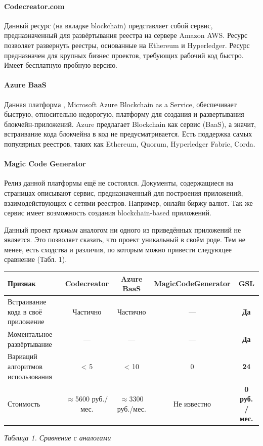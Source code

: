 \paragraph{Codecreator.com}
Данный ресурс \cite{CodeCreator} (на вкладке blockchain) представляет собой
сервис, предназначенный для развёртывания реестра на сервере Amazon AWS. Ресурс
позволяет развернуть реестры, основанные на Ethereum и Hyperledger. Ресурс
предназначен для крупных бизнес проектов, требующих рабочий код быстро. Имеет
бесплатную пробную версию.

\paragraph{Azure BaaS}
Данная платформа \cite{MicrosoftAzure}, Microsoft Azure Blockchain as a
Service, обеспечивает быструю, относительно недорогую, платформу для создания и
развертывания блокчейн-приложений. Azure предлагает Blockchain как сервис
(BaaS), а значит, встраивание кода блокчейна в код не предусматривается. Есть
поддержка самых популярных реестров, таких как Ethereum, Quorum, Hyperledger
Fabric, Corda.

\paragraph{Magic Code Generator}
Релиз данной платформы \cite{mcg} ещё не состоялся.  Документы, содержащиеся на
страницах описывают сервис, предназначенный для построения приложений,
взаимодействующих с сетями реестров. Например, онлайн биржу валют. Так же
сервис имеет возможность создания blockchain-based приложений.


Данный проект \emph{прямым} аналогом ни одного из приведённых приложений не
является. Это позволяет сказать, что проект уникальный в своём роде. Тем не
менее, есть сходства и различия, по которым можно привести следующее сравнение
(Табл. 1).

\begin{center}
    \begin{tabular}{ | p{4cm} | c | c | c | c | }
    \hline
    \hline
      Признак & Codecreator & Azure BaaS & MagicCodeGenerator\footnotemark & \textbf{GSL} \\ \hline
      Встраивание кода в своё приложение & Частично & Частично & --- & \textbf{Да} \\ \hline
      Моментальное развёртывание & --- & --- & --- & \textbf{Да} \\ \hline
      Вариаций алгоритмов использования & < 5 & < 10 & 0 & \textbf{24} \\ \hline
      Стоимость & $\approx$5600 руб./мес. & $\approx$3300 руб./мес. & Не известно & \textbf{0 руб. / мес.} \\ \hline
    \hline
  \end{tabular}

    \vspace{-5cm} \hfill \emph{Таблица 1. Сравнение с аналогами} \vspace{4.1cm}
\end{center}


